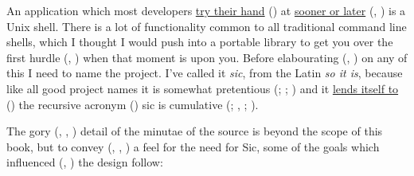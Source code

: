 An application which most developers \underline{try their hand} ({\MdQ{}}) at
\underline{sooner or later} ({\MjQ{}}, {\MbQ{}}) is 
a Unix shell. There is a lot of functionality common to all traditional 
command line shells, which I thought I would push into a portable 
library to get you over the first hurdle ({\MjQ{}}, {\MeQ{}}) when that 
moment is upon you. Before elabourating ({\MmQ{}}, {\MjQ{}}) on any of this I 
need to name the project. I've called it \textit{sic}, from the Latin 
\textit{so it is}, because like all good project names it is somewhat 
pretentious ({\McQ{}}; {\McQ{}}; {\MhQ{}}) and it \underline{lends itself to}
({\MjQ{}}) the recursive acronym ({\McQ{}}) sic is cumulative ({\MgQ{}}; {\MiQ{}},
{\MhQ{}}; {\MhQ{}}). 

The gory ({\MiQ{}}, {\MaQ{}}, {\MgQ{}}) detail of the minutae of the source 
is beyond the scope of this book, but to convey ({\McQ{}}, {\MfQ{}}, {\McQ{}}) a feel 
for the need for Sic, some of the goals which influenced ({\MfQ{}}, {\MaQ{}})
the design follow: 


